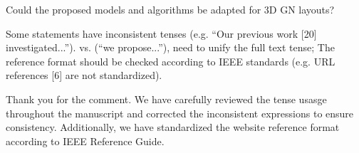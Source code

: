 \begin{revcomment}
	Could the proposed models and algorithms be adapted for 3D GN layouts?
\end{revcomment}
\begin{revresponse}
	
\end{revresponse}

\begin{revcomment}
	Some statements have inconsistent tenses (e.g. ``Our previous work [20] investigated...''). vs. (``we propose...''), need to unify the full text tense; The reference format should be checked according to IEEE standards (e.g. URL references [6] are not standardized).
\end{revcomment}
\begin{revresponse}
	Thank you for the comment.
	We have carefully reviewed the tense usasge throughout the manuscript and corrected the inconsistent expressions to ensure consistency. Additionally, we have standardized the website reference format according to IEEE Reference Guide.
\end{revresponse}

